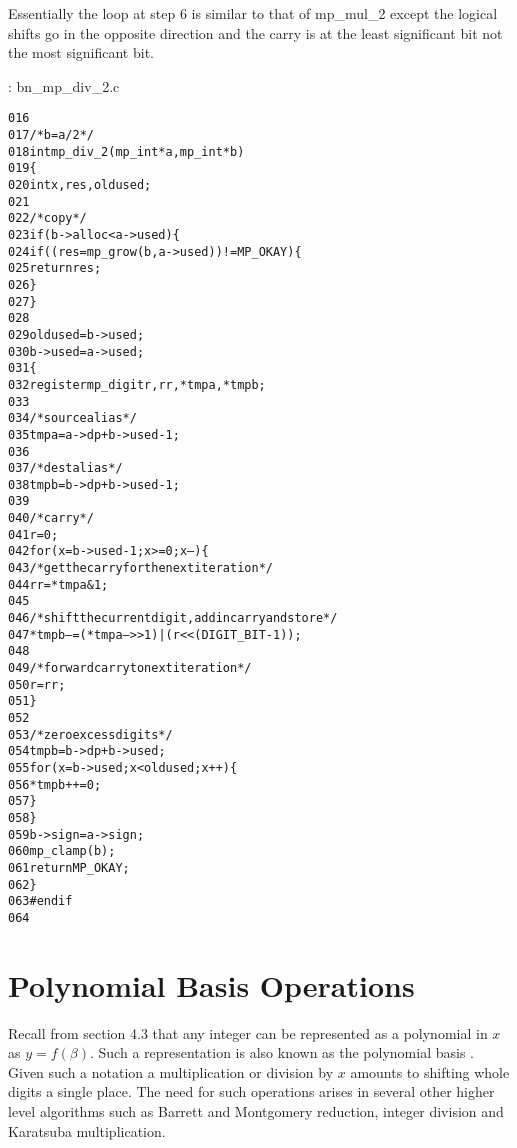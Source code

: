 \documentclass[b5paper]{book}
\begin{document}
Essentially the loop at step 6 is similar to that of mp\_mul\_2 except the logical shifts go in the opposite direction and the carry is at the 
least significant bit not the most significant bit.  

\vspace{+3mm}\begin{small}
\hspace{-5.1mm}{\bf File}: bn\_mp\_div\_2.c
\vspace{-3mm}
\begin{alltt}
016   
017   /* b = a/2 */
018   int mp_div_2(mp_int * a, mp_int * b)
019   \{
020     int     x, res, oldused;
021   
022     /* copy */
023     if (b->alloc < a->used) \{
024       if ((res = mp_grow (b, a->used)) != MP_OKAY) \{
025         return res;
026       \}
027     \}
028   
029     oldused = b->used;
030     b->used = a->used;
031     \{
032       register mp_digit r, rr, *tmpa, *tmpb;
033   
034       /* source alias */
035       tmpa = a->dp + b->used - 1;
036   
037       /* dest alias */
038       tmpb = b->dp + b->used - 1;
039   
040       /* carry */
041       r = 0;
042       for (x = b->used - 1; x >= 0; x--) \{
043         /* get the carry for the next iteration */
044         rr = *tmpa & 1;
045   
046         /* shift the current digit, add in carry and store */
047         *tmpb-- = (*tmpa-- >> 1) | (r << (DIGIT_BIT - 1));
048   
049         /* forward carry to next iteration */
050         r = rr;
051       \}
052   
053       /* zero excess digits */
054       tmpb = b->dp + b->used;
055       for (x = b->used; x < oldused; x++) \{
056         *tmpb++ = 0;
057       \}
058     \}
059     b->sign = a->sign;
060     mp_clamp (b);
061     return MP_OKAY;
062   \}
063   #endif
064   
\end{alltt}
\end{small}

\section{Polynomial Basis Operations}
Recall from section 4.3 that any integer can be represented as a polynomial in $x$ as $y = f(\beta)$.  Such a representation is also known as
the polynomial basis \cite[pp. 48]{ROSE}. Given such a notation a multiplication or division by $x$ amounts to shifting whole digits a single 
place.  The need for such operations arises in several other higher level algorithms such as Barrett and Montgomery reduction, integer
division and Karatsuba multiplication.  
\end{document}
